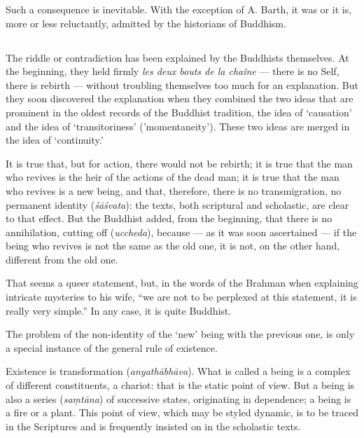 \documentclass[a4paper, 11pt, oneside, english, landscape]{article}
\begin{document}
Such a consequence is inevitable. With the exception of A. Barth, it was or it is, more or less reluctantly, admitted by the historians of Buddhism.

\subsection{}
\paragraph{}
The riddle or contradiction has been explained by the Buddhists themselves. At the beginning, they held firmly \emph{les deux bouts de la chaîne} --- there is no Self, there is rebirth --- without troubling themselves too much for an explanation. But they soon discovered the explanation when they combined the two ideas that are prominent in the oldest records of the Buddhist tradition, the idea of `causation' and the idea of `transitoriness' ('momentaneity'). These two ideas are merged in the idea of `continuity.'

It is true that, but for action, there would not be rebirth; it is true that the man who revives is the heir of the actions of the dead man; it is true that the man who revives is a new being, and that, therefore, there is no transmigration, no permanent identity (\emph{śāśvata}): the texts, both scriptural and scholastic, are clear to that effect. But the Buddhist added, from the beginning, that there is no annihilation, cutting off (\emph{uccheda}), because --- as it was soon ascertained --- if the being who revives is not the same as the old one, it is not, on the other hand, different from the old one.

That seems a queer statement, but, in the words of the Brahman when explaining intricate mysteries to his wife, ``we are not to be perplexed at this statement, it is really very simple.'' In any case, it is quite Buddhist.

The problem of the non-identity of the `new' being with the previous one, is only a special instance of the general rule of existence.

Existence is transformation (\emph{anyathābhāva}). What is called a being is a complex of different constituents, a chariot: that is the static point of view. But a being is also a series (\emph{saṃtāna}) of successive states, originating in dependence; a being is a fire or a plant. This point of view, which may be styled dynamic, is to be traced in the Scriptures and is frequently insisted on in the scholastic texts.
\end{document}
